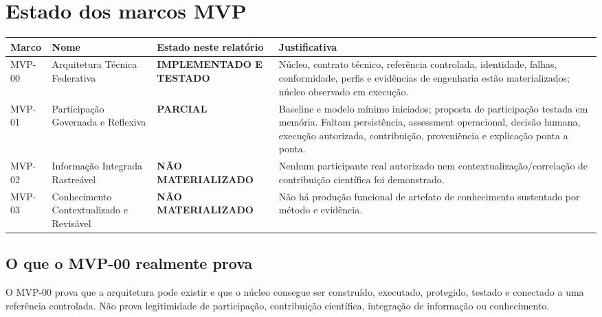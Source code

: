 \documentclass[11pt,a4paper,oneside]{article}
\newcommand{\statustestado}{\textcolor{sisterblue}{\textbf{IMPLEMENTADO E TESTADO}}}
\newcommand{\statusparcial}{\textcolor{sisteramber}{\textbf{PARCIAL}}}
\newcommand{\statusausente}{\textcolor{sisterred}{\textbf{NÃO MATERIALIZADO}}}
\begin{document}
\begin{landscape}
\end{landscape}

\section{Estado dos marcos MVP}

\begin{tabularx}{\textwidth}{P{1.6cm}P{4.2cm}P{3.2cm}Y}
\toprule
\textbf{Marco} & \textbf{Nome} & \textbf{Estado neste relatório} & \textbf{Justificativa} \\
\midrule
MVP-00 & Arquitetura Técnica Federativa & \statustestado & Núcleo, contrato técnico, referência controlada, identidade, falhas, conformidade, perfis e evidências de engenharia estão materializados; núcleo observado em execução. \\
MVP-01 & Participação Governada e Reflexiva & \statusparcial & Baseline e modelo mínimo iniciados; proposta de participação testada em memória. Faltam persistência, assessment operacional, decisão humana, execução autorizada, contribuição, proveniência e explicação ponta a ponta. \\
MVP-02 & Informação Integrada Rastreável & \statusausente & Nenhum participante real autorizado nem contextualização/correlação de contribuição científica foi demonstrado. \\
MVP-03 & Conhecimento Contextualizado e Revisável & \statusausente & Não há produção funcional de artefato de conhecimento sustentado por método e evidência. \\
\bottomrule
\end{tabularx}

\subsection{O que o MVP-00 realmente prova}

O MVP-00 prova que a arquitetura pode existir e que o núcleo consegue ser construído, executado, protegido, testado e conectado a uma referência controlada. Não prova legitimidade de participação, contribuição científica, integração de informação ou conhecimento.
\end{document}
